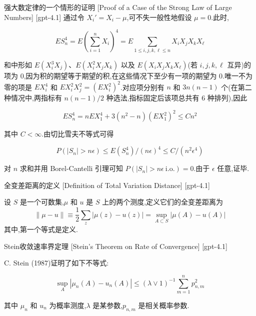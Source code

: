 \documentclass[UTF8]{ctexart}
\begin{document}
    \begin{prf}
        {强大数定律的一个情形的证明}
        [Proof of a Case of the Strong Law of Large Numbers]
        [gpt-4.1]
        通过令 $X_{i}' = X_{i} - \mu$,可不失一般性地假设 $\mu = 0$.此时,

\[
E S_{n}^{4} = E \left( \sum_{i=1}^{n} X_{i} \right)^{4} = E \sum_{1 \leq i, j, k, \ell \leq n} X_{i} X_{j} X_{k} X_{\ell}
\]

和中形如 $E(X_{i}^{3} X_{j})$、$E(X_{i}^{2} X_{j} X_{k})$ 以及 $E(X_{i} X_{j} X_{k} X_{\ell})$(若 $i, j, k, \ell$ 互异)的项为 0,因为积的期望等于期望的积,在这些情况下至少有一项的期望为 0.唯一不为零的项是 $E X_{i}^{4}$ 和 $E X_{i}^{2} X_{j}^{2} = (E X_{i}^{2})^{2}$.对应项分别有 $n$ 和 $3n(n-1)$ 个(在第二种情况中,两指标有 $n(n-1)/2$ 种选法,指标固定后该项总共有 6 种排列),因此

\[
E S_{n}^{4} = n E X_{1}^{4} + 3(n^{2} - n)(E X_{1}^{2})^{2} \leq C n^{2}
\]

其中 $C < \infty$.由切比雪夫不等式可得

\[
P(|S_{n}| > n \epsilon) \leq E(S_{n}^{4}) / (n \epsilon)^{4} \leq C / (n^{2} \epsilon^{4})
\]

对 $n$ 求和并用 Borel-Cantelli 引理可知 $P(|S_{n}| > n \epsilon \ \text{i.o.}) = 0$.由于 $\epsilon$ 任意,证毕.
    \end{prf}
    
    
    
    \begin{dfn}
        {全变差距离的定义}
        [Definition of Total Variation Distance]
        [gpt-4.1]
        
设 $S$ 是一个可数集,$\mu$ 和 $
u$ 是 $S$ 上的两个测度,定义它们的全变差距离为
\[
\| \mu - 
u \| \equiv { \frac { 1 } { 2 } } \sum _ { z } | \mu ( z ) - 
u ( z ) | = \sup _ {A \subset S} | \mu ( A ) - 
u ( A ) |
\]
其中,第一个等式是定义.

    \end{dfn}
    
    
    
    \begin{thm}
        {Stein收敛速率界定理}
        [Stein's Theorem on Rate of Convergence]
        [gpt-4.1]
        
C. Stein (1987)证明了如下不等式:

\[
\sup_{A} | \mu_n(A) - 
u_n(A) | \leq (\lambda \vee 1)^{-1} \sum_{m = 1}^n p_{n, m}^2
\]

其中 $\mu_n$ 和 $
u_n$ 为概率测度,$\lambda$ 是某参数,$p_{n, m}$ 是相关概率参数.

    \end{thm}
    
\end{document}
